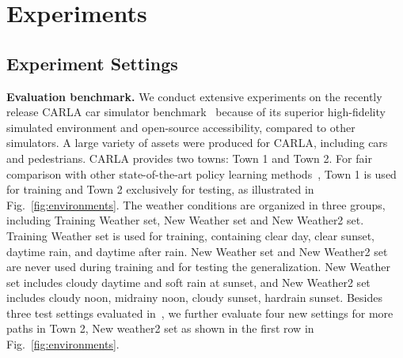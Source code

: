 \documentclass[runningheads]{llncs}
\begin{document}
\section{Experiments}


    
    
\subsection{Experiment Settings}

\noindent\textbf{Evaluation benchmark.} We conduct extensive experiments on the recently release CARLA car simulator benchmark~\cite{dosovitskiy2017carla} because of its superior high-fidelity simulated environment and open-source accessibility, compared to other simulators. A large variety of assets were produced for CARLA, including cars and pedestrians. CARLA provides two towns: Town 1 and Town 2. For fair comparison with other state-of-the-art policy learning methods~\cite{dosovitskiy2017carla,codevilla2017end}, Town 1 is used for training and Town 2 exclusively for testing, as illustrated in Fig.~\ref{fig:environments}. The weather conditions are organized in three groups, including Training Weather set, New Weather set and New Weather2 set. Training Weather set is used for training, containing clear day, clear sunset, daytime rain, and daytime after rain. New Weather set and New Weather2 set are never used during training and for testing the generalization. New Weather set includes cloudy daytime and soft rain at sunset, and New Weather2 set includes cloudy noon, midrainy noon,  cloudy sunset, hardrain sunset. Besides three test settings evaluated in~\cite{dosovitskiy2017carla}, we further evaluate four new settings for more paths in Town 2, New weather2 set as shown in the first row in Fig.~\ref{fig:environments}. 
\end{document}

